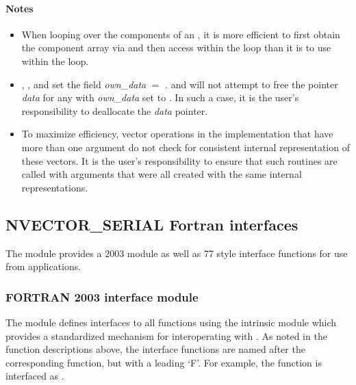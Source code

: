 \paragraph{\bf Notes}                                                      
           
\begin{itemize}
                                        
\item
  When looping over the components of an  , it is     
  more efficient to first obtain the component array via       
   and then access  within the     
  loop than it is to use  within the loop.        

\item
  {\warn}, , 
  and  set the field 
  {\em own\_data} $=$ . 
   and 
  will not attempt to free the pointer {\em data} for any  with
  {\em own\_data} set to . In such a case, it is the user's responsibility to
  deallocate the {\em data} pointer.
                                     
\item
  {\warn}To maximize efficiency, vector operations in the {\nvecs} implementation
  that have more than one  argument do not check for
  consistent internal representation of these vectors. It is the user's 
  responsibility to ensure that such routines are called with 
  arguments that were all created with the same internal representations.

\end{itemize}


\subsection{NVECTOR\_SERIAL Fortran interfaces}
\label{ss:nvec_ser_fortran}

The {\nvecs} module provides a {\F} 2003 module as well as {\F} 77
style interface functions for use from {\F} applications.

\subsubsection*{FORTRAN 2003 interface module}
The  {\F} module defines interfaces to all
{\nvecs} {\CC} functions using the intrinsic 
module which provides a standardized mechanism for interoperating with {\CC}. As
noted in the {\CC} function descriptions above, the interface functions are
named after the corresponding {\CC} function, but with a leading `F'. For
example, the function  is interfaced as
.


